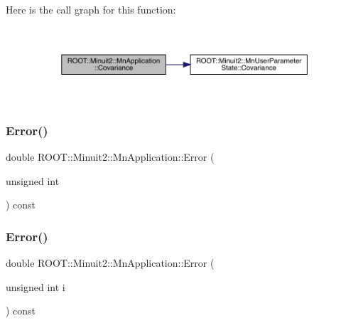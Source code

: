Here is the call graph for this function\+:
\nopagebreak
\begin{figure}[H]
\begin{center}
\leavevmode
\includegraphics[width=350pt]{df/dd5/classROOT_1_1Minuit2_1_1MnApplication_abd83494a6b9b808683edc162c28a9888_cgraph}
\end{center}
\end{figure}
\mbox{\label{classROOT_1_1Minuit2_1_1MnApplication_aedc3775627672ba2038e8a26d6df13f1}} 
\subsubsection{\texorpdfstring{Error()}{Error()}\hspace{0.1cm}{\footnotesize\ttfamily [1/4]}}
{\footnotesize\ttfamily double R\+O\+O\+T\+::\+Minuit2\+::\+Mn\+Application\+::\+Error (\begin{DoxyParamCaption}\item[{unsigned int}]{ }\end{DoxyParamCaption}) const}

\mbox{\label{classROOT_1_1Minuit2_1_1MnApplication_aedc3775627672ba2038e8a26d6df13f1}} 
\subsubsection{\texorpdfstring{Error()}{Error()}\hspace{0.1cm}{\footnotesize\ttfamily [2/4]}}
{\footnotesize\ttfamily double R\+O\+O\+T\+::\+Minuit2\+::\+Mn\+Application\+::\+Error (\begin{DoxyParamCaption}\item[{unsigned int}]{i }\end{DoxyParamCaption}) const}

